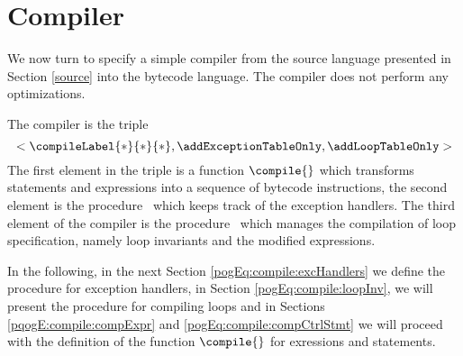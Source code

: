 

\newtheorem{Compiler}{Definition}

\section{Compiler} \label{compile}

We now turn to specify a simple compiler from the source language presented in Section
\ref{source} into the bytecode language. The compiler does not perform any optimizations. 

The compiler is the triple
 $$< \compileLabel{*}{*}{*}, \addExceptionTableOnly , \addLoopTableOnly >$$
 The first element in the triple is a  function $\compile{}$ which transforms statements and expressions
 into a sequence of bytecode instructions, the second element is the procedure 
 \addExceptionTableOnly \ which  keeps track of the exception handlers. The third element of the compiler is the procedure
  \addLoopTableOnly \ which manages the compilation of loop
specification, namely loop invariants and the modified expressions.

In the following, in the next Section \ref{pogEq:compile:excHandlers} we define the procedure for exception handlers,
 in Section \ref{pogEq:compile:loopInv},  we will present the procedure for compiling loops and in  Sections 
\ref{pqogE:compile:compExpr} and  \ref{pogEq:compile:compCtrlStmt}
we will proceed with the definition of the function $\compile{}$ for exressions and statements.





%


